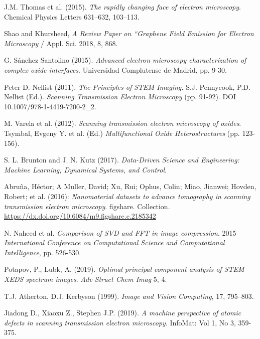 
 \normalsize



\begin{thebibliography}{9}

J.M. Thomas et al. (2015). \textit{The rapidly changing face of electron microscopy}. Chemical Physics Letters 631–632, 103–113.

Shao and Khursheed, \textit{A Review Paper on “Graphene Field Emission for Electron Microscopy} / Appl. Sci. 2018, 8, 868.

G. Sánchez Santolino (2015). \textit{Advanced electron microscopy characterization of complex oxide interfaces}. Universidad Complutense de Madrid, pp. 9-30.

Peter D. Nellist (2011). \textit{The Principles of STEM Imaging.} S.J. Pennycook, P.D. Nellist (Ed.). \textit{Scanning Transmission Electron Microscopy }(pp. 91-92). DOI 10.1007/978-1-4419-7200-2\_2. 

M. Varela et al. (2012). \textit{Scanning transmission electron microscopy of oxides}. Tsymbal, Evgeny Y. et al. (Ed.) \textit{Multifunctional Oxide Heterostructures} (pp. 123-156).

S. L. Brunton and J. N. Kutz (2017). \textit{Data-Driven Science and Engineering: Machine Learning, Dynamical Systems, and Control}.

Abruña, Héctor; A Muller, David; Xu, Rui; Ophus, Colin; Miao, Jianwei; Hovden, Robert; et al. (2016): \textit{Nanomaterial datasets to advance tomography in scanning transmission electron microscopy}. figshare. Collection. \href{https://dx.doi.org/10.6084/m9.figshare.c.2185342}{https://dx.doi.org/10.6084/m9.figshare.c.2185342}

N. Naheed et al. \textit{Comparison of SVD and FFT in image compression}. 2015 \textit{International Conference on Computational Science and Computational Intelligence}, pp. 526-530.

Potapov, P., Lubk, A. (2019). \textit{Optimal principal component analysis of STEM XEDS spectrum images}. \textit{Adv Struct Chem Imag} 5, 4. 

T.J. Atherton, D.J. Kerbyson (1999). \textit{Image and Vision Computing}, 17, 795–803.

Jiadong D., Xiaoxu Z., Stephen J.P. (2019). \textit{A machine perspective of atomic defects in scanning transmission electron microscopy}. InfoMat: Vol 1, No 3, 359-375.


\end{thebibliography}
